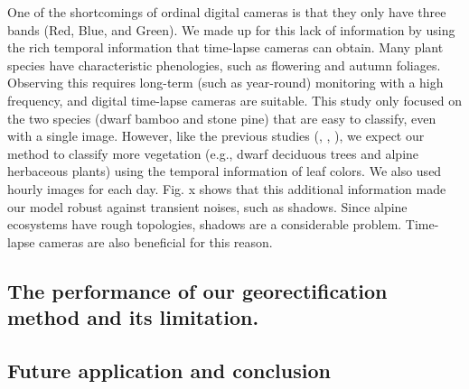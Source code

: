 \documentclass{article}
\begin{document}
One of the shortcomings of ordinal digital cameras is that they only
have three bands (Red, Blue, and Green). We made up for this lack of
information by using the rich temporal information that time-lapse
cameras can obtain. Many plant species have characteristic phenologies,
such as flowering and autumn foliages. Observing this requires long-term
(such as year-round) monitoring with a high frequency, and digital
time-lapse cameras are suitable. This study only focused on the two
species (dwarf bamboo and stone pine) that are easy to classify, even
with a single image. However, like the previous studies
(\cite{Tigges2013RemSenEnv}, \cite{Son2013RemSen},
\cite{Heupel2018PFG}), we expect our method to classify more vegetation
(e.g., dwarf deciduous trees and alpine herbaceous plants) using the
temporal information of leaf colors. We also used hourly images for each
day. Fig. x shows that this additional information made our model robust
against transient noises, such as shadows. Since alpine ecosystems have
rough topologies, shadows are a considerable problem. Time-lapse cameras
are also beneficial for this reason.

\hypertarget{the-performance-of-our-georectification-method-and-its-limitation.}{%
\subsection{The performance of our georectification method and its
limitation.}\label{the-performance-of-our-georectification-method-and-its-limitation.}}

\hypertarget{future-application-and-conclusion}{%
\subsection{Future application and
conclusion}\label{future-application-and-conclusion}}



\end{document}
